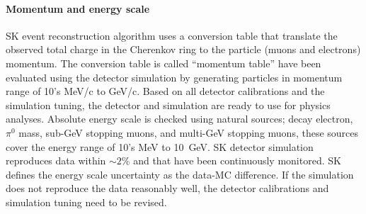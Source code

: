 \paragraph{Momentum and energy scale}

SK event reconstruction algorithm uses a conversion table that translate the observed total
charge in the Cherenkov ring to the particle (muons and electrons) momentum.
The conversion table is called ``momentum table'' have been evaluated using the detector
simulation by generating particles in momentum range of 10's MeV/c to GeV/c.
%
Based on all detector calibrations and the simulation tuning, the detector and simulation
are ready to use for physics analyses.
Absolute energy scale is checked using natural sources; decay electron, $\pi^{0}$ mass,
sub-GeV stopping muons, and multi-GeV stopping muons, these sources cover the energy range of
10's MeV to 10~GeV.
SK detector simulation reproduces data within $\sim2$\% and that have been continuously
monitored.
SK defines the energy scale uncertainty as the data-MC difference.
If the simulation does not reproduce the data reasonably well, the detector calibrations
and simulation tuning need to be revised.


%

